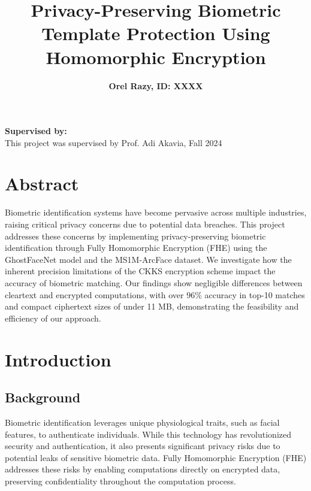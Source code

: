 \documentclass[12pt,a4paper]{article}
\title{\textbf{Privacy-Preserving Biometric Template Protection Using Homomorphic Encryption}}
\author{\textbf{Orel Razy, ID: XXXX}}
\date{} %
\begin{document}
\maketitle

\begin{center}
\textbf{Supervised by:}\\
This project was supervised by Prof. Adi Akavia, Fall 2024
\end{center}

\bigskip

\section*{Abstract}
Biometric identification systems have become pervasive across multiple industries, raising critical 
privacy concerns due to potential data breaches. This project addresses these concerns by implementing 
privacy-preserving biometric identification through Fully Homomorphic Encryption (FHE) using the 
GhostFaceNet model and the MS1M-ArcFace dataset. We investigate how the inherent precision limitations 
of the CKKS encryption scheme impact the accuracy of biometric matching. Our findings show negligible 
differences between cleartext and encrypted computations, with over 96\% accuracy in top-10 matches 
and compact ciphertext sizes of under 11 MB, demonstrating the feasibility and efficiency of our 
approach.

\newpage

\section{Introduction}

\subsection{Background}
Biometric identification leverages unique physiological traits, such as facial features, to authenticate 
individuals. While this technology has revolutionized security and authentication, it also presents 
significant privacy risks due to potential leaks of sensitive biometric data. Fully Homomorphic 
Encryption (FHE) addresses these risks by enabling computations directly on encrypted data, preserving 
confidentiality throughout the computation process.
\end{document}
